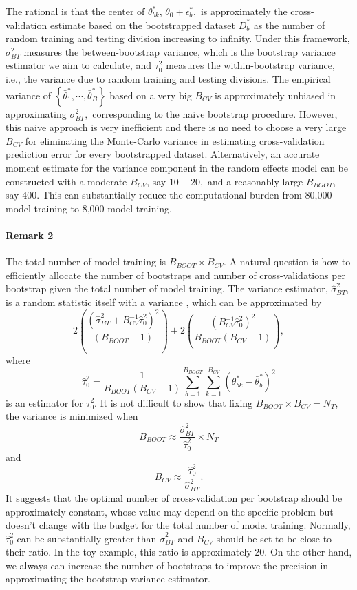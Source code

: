 \documentclass[12pt]{article}
\begin{document}
The rational is that the center of $\theta^*_{bk}$, $\theta_0+\epsilon_{b}^*,$ is approximately the cross-validation estimate based on the bootstrapped dataset $D^*_b$ as the number of random training and testing  division increasing to infinity. Under this framework, $\sigma_{BT}^2$ measures the between-bootstrap variance, which is the bootstrap variance estimator we aim to calculate,  and $\tau_0^2$ measures the within-bootstrap variance, i.e., the variance due to random training and testing divisions. The empirical variance of $\left\{\bar{\theta}^*_1, \cdots, \bar{\theta}^*_B\right\}$ based on a very big $B_{CV}$ is approximately unbiased in approximating $\sigma_{BT}^2,$ corresponding to the naive bootstrap procedure.  However, this naive approach is very inefficient and there is no need to choose a very large $B_{CV}$ for eliminating the Monte-Carlo variance in estimating cross-validation prediction error for every bootstrapped dataset. Alternatively, an accurate moment estimate for the variance component in the random effects model can be constructed with a moderate $B_{CV}$, say $10-20,$ and a reasonably large $B_{BOOT},$ say 400. This can substantially reduce the computational burden from 80,000 model training to 8,000 model training. 

\paragraph{Remark 2} The total number of model training is $B_{BOOT}\times B_{CV}.$  A natural question is how to efficiently allocate the number of bootstraps and number of cross-validations per bootstrap given the total number of model training.   The variance estimator, $\hat{\sigma}_{BT}^{2},$ is a random statistic itself with a variance \cite{boardman1974confidence, williams1962confidence}, which can be approximated by 
$$  2\left(\frac{\left(\hat{\sigma}_{BT}^2+B_{CV}^{-1}\hat{\tau}_{0}^2\right)^2}{(B_{BOOT}-1)} \right)+2\left(\frac{\left(B_{CV}^{-1}\hat{\tau}_{0}^2 \right)^2}{B_{BOOT}(B_{CV}-1)} \right),$$
where
$$\hat{\tau}_{0}^2= \frac{1}{B_{BOOT}(B_{CV}-1)}\sum_{b=1}^{B_{BOOT}}\sum_{k=1}^{B_{CV}}(\theta^*_{bk}-\bar{\theta}^*_{b})^2$$
is an estimator for $\tau_0^2.$ It is not difficult to show that fixing $B_{BOOT}\times B_{CV}=N_T$, the variance is minimized when 
$$B_{BOOT}\approx \frac{\hat{\sigma}^2_{BT}}{\hat{\tau}^2_{0}}\times N_T$$
and 
$$B_{CV}\approx \frac{\hat{\tau}^2_{0}}{\hat{\sigma}^2_{BT}}.$$
It suggests that the optimal number of cross-validation per bootstrap should be approximately constant, whose value may depend on the specific problem but doesn't change with the budget for the total number of model training. Normally, $\hat{\tau}^2_{0}$ can be substantially greater than $\hat{\sigma}_{BT}^2$ and $B_{CV}$ should be set to be close to their ratio. In the toy example, this ratio is approximately 20. On the other hand, we always can increase the number of bootstraps to improve the precision in approximating the bootstrap variance estimator.  
\end{document}
